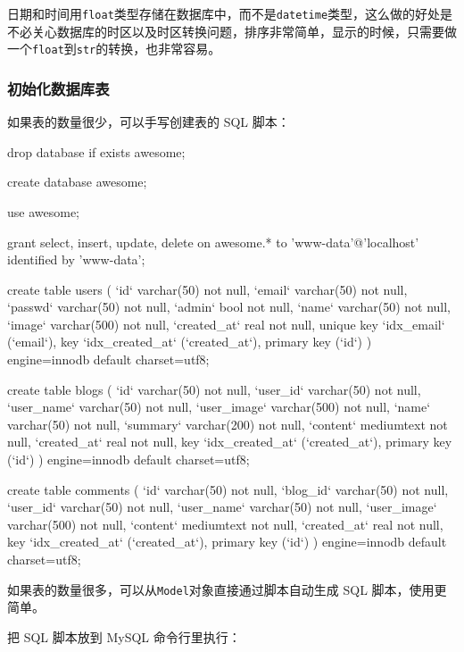 日期和时间用\texttt{float}类型存储在数据库中，而不是\texttt{datetime}类型，这么做的好处是不必关心数据库的时区以及时区转换问题，排序非常简单，显示的时候，只需要做一个\texttt{float}到\texttt{str}的转换，也非常容易。

\hypertarget{ux521dux59cbux5316ux6570ux636eux5e93ux8868}{%
\subsubsection{初始化数据库表}\label{ux521dux59cbux5316ux6570ux636eux5e93ux8868}}

如果表的数量很少，可以手写创建表的 SQL 脚本：

\begin{pythoncode}
drop database if exists awesome;

create database awesome;

use awesome;

grant select, insert, update, delete on awesome.* to 'www-data'@'localhost' identified by 'www-data';

create table users (
    `id` varchar(50) not null,
    `email` varchar(50) not null,
    `passwd` varchar(50) not null,
    `admin` bool not null,
    `name` varchar(50) not null,
    `image` varchar(500) not null,
    `created_at` real not null,
    unique key `idx_email` (`email`),
    key `idx_created_at` (`created_at`),
    primary key (`id`)
) engine=innodb default charset=utf8;

create table blogs (
    `id` varchar(50) not null,
    `user_id` varchar(50) not null,
    `user_name` varchar(50) not null,
    `user_image` varchar(500) not null,
    `name` varchar(50) not null,
    `summary` varchar(200) not null,
    `content` mediumtext not null,
    `created_at` real not null,
    key `idx_created_at` (`created_at`),
    primary key (`id`)
) engine=innodb default charset=utf8;

create table comments (
    `id` varchar(50) not null,
    `blog_id` varchar(50) not null,
    `user_id` varchar(50) not null,
    `user_name` varchar(50) not null,
    `user_image` varchar(500) not null,
    `content` mediumtext not null,
    `created_at` real not null,
    key `idx_created_at` (`created_at`),
    primary key (`id`)
) engine=innodb default charset=utf8;
\end{pythoncode}

如果表的数量很多，可以从\texttt{Model}对象直接通过脚本自动生成 SQL
脚本，使用更简单。

把 SQL 脚本放到 MySQL 命令行里执行：


